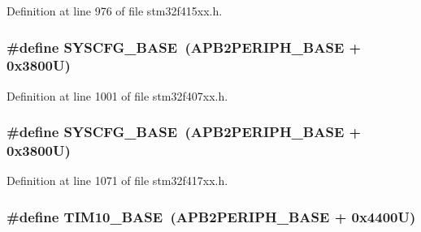 Definition at line 976 of file stm32f415xx.\+h.

\subsubsection[{\texorpdfstring{S\+Y\+S\+C\+F\+G\+\_\+\+B\+A\+SE}{SYSCFG_BASE}}]{\setlength{\rightskip}{0pt plus 5cm}\#define S\+Y\+S\+C\+F\+G\+\_\+\+B\+A\+SE~({\bf A\+P\+B2\+P\+E\+R\+I\+P\+H\+\_\+\+B\+A\+SE} + 0x3800\+U)}\hypertarget{group___peripheral__registers__structures_ga62246020bf3b34b6a4d8d0e84ec79d3d}{}\label{group___peripheral__registers__structures_ga62246020bf3b34b6a4d8d0e84ec79d3d}


Definition at line 1001 of file stm32f407xx.\+h.

\subsubsection[{\texorpdfstring{S\+Y\+S\+C\+F\+G\+\_\+\+B\+A\+SE}{SYSCFG_BASE}}]{\setlength{\rightskip}{0pt plus 5cm}\#define S\+Y\+S\+C\+F\+G\+\_\+\+B\+A\+SE~({\bf A\+P\+B2\+P\+E\+R\+I\+P\+H\+\_\+\+B\+A\+SE} + 0x3800\+U)}\hypertarget{group___peripheral__registers__structures_ga62246020bf3b34b6a4d8d0e84ec79d3d}{}\label{group___peripheral__registers__structures_ga62246020bf3b34b6a4d8d0e84ec79d3d}


Definition at line 1071 of file stm32f417xx.\+h.

\subsubsection[{\texorpdfstring{T\+I\+M10\+\_\+\+B\+A\+SE}{TIM10_BASE}}]{\setlength{\rightskip}{0pt plus 5cm}\#define T\+I\+M10\+\_\+\+B\+A\+SE~({\bf A\+P\+B2\+P\+E\+R\+I\+P\+H\+\_\+\+B\+A\+SE} + 0x4400\+U)}\hypertarget{group___peripheral__registers__structures_ga3eff32f3801db31fb4b61d5618cad54a}{}\label{group___peripheral__registers__structures_ga3eff32f3801db31fb4b61d5618cad54a}


